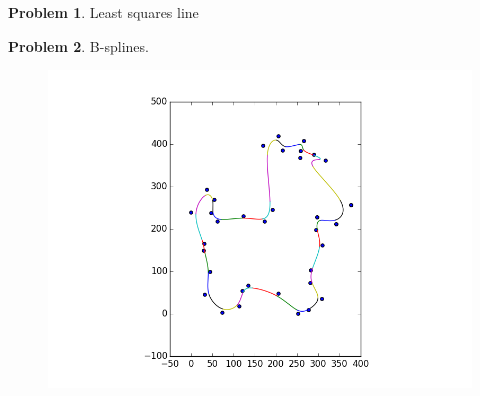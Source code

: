 \documentclass[10pt]{article}
\theoremstyle{plain}
\theoremstyle{definition}
\newtheorem{prob}{Problem}
\numberwithin{equation}{section}
\begin{document}
\begin{prob}
    Least squares line
\end{prob}
\begin{prob}
    B-splines.
    \begin{figure}[h]
        \centering
        \includegraphics[width=\textwidth]{doggy_splines}
    \end{figure}
\end{prob}
\end{document}
